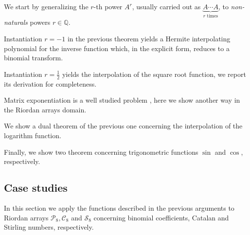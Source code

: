 We start by generalizing the $r$-th power $A^{r}$, usually carried out
as $\underbrace{A\cdots A}_{r\text{ times}}$, to \textit{non-naturals} powers
$r\in\mathbb{Q}$.



Instantiation $r=-1$ in the previous theorem yields a Hermite interpolating
polynomial for the inverse function which, in the explicit form, reduces to
a binomial transform.



Instantiation $r=\frac{1}{2}$ yields the interpolation of the square root function,
we report its derivation for completeness.



Matrix exponentiation is a well studied problem \citep{MOLERLOAN2003}, here
we show another way in the Riordan arrays domain.



We show a dual theorem of the previous one concerning the interpolation of the
logarithm function.



Finally, we show two theorem concerning trigonometric functions $\sin$ and
$\cos$, respectively.





\vfill

\subsection{Case studies}

In this section we apply the functions described in the previous arguments to
Riordan arrays $\mathcal{P}_{8}, \mathcal{C}_{8}$ and $\mathcal{S}_{8}$
concerning binomial coefficients, Catalan and Stirling numbers, respectively.









